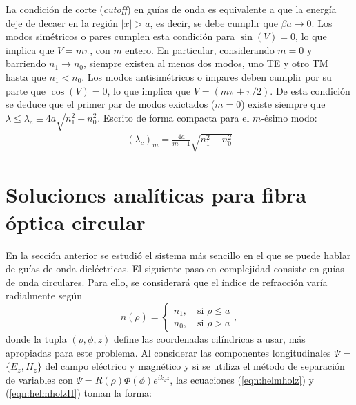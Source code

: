 La condición de corte (\textit{cutoff}) en guías de onda es equivalente a que la energía deje de decaer en la región $|x| > a$, es decir, se debe cumplir que $\beta a \to 0$. 
Los modos simétricos o pares cumplen esta condición para $\sin(V) = 0$, lo que implica que $V = m \pi$, con $m$ entero. En particular, considerando $m=0$  y barriendo $n_1 \to n_0$, siempre existen al menos dos modos, uno TE y otro TM hasta que $n_1 < n_0$.  
Los modos antisimétricos o impares deben cumplir por su parte que $\cos(V) = 0$, lo que implica que $V = (m\pi \pm \pi/2)$. De esta condición se deduce que el primer par de modos exictados ($m=0$) existe siempre que $\lambda \le \lambda_c \equiv 4a\sqrt{n_1^2-n_0^2}$. Escrito de forma compacta para el $m$-ésimo modo:
\begin{align*}
	 (\lambda_c)_m = \frac{4a}{m-1}  \sqrt{n_1^2-n_0^2}
\end{align*}

\section{Soluciones analíticas para fibra óptica circular}
En la sección anterior se estudió el sistema más sencillo en el que se puede hablar de guías de onda dieléctricas. El siguiente paso en complejidad consiste en guías de onda circulares. Para ello, se considerará que el índice de refracción varía radialmente según 
\begin{equation}
	n( \rho ) = 
	\left\{\begin{matrix}
	n_1, \quad \text{si } \rho \le a
	\\
	n_0, \quad \text{si } \rho > a
	\end{matrix}\right.
	,\nonumber
\end{equation}
donde la tupla $(\rho, \phi, z)$ define las coordenadas cilíndricas a usar, más apropiadas para este problema. 
Al considerar las componentes longitudinales $\Psi$ = $\{E_z, H_z\}$ del campo eléctrico y magnético y  si se utiliza el método de separación de variables con $\Psi =  R(\rho)\Phi(\phi) e^{ik_z z} $,  las ecuaciones (\ref{eqn:helmholz}) y (\ref{eqn:helmholzH}) toman la forma:

